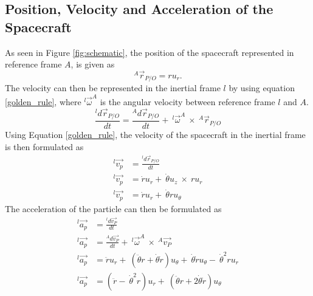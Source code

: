 \documentclass[]{article}
\begin{document}
	\subsection{Position, Velocity and Acceleration of the Spacecraft}
	As seen in Figure \ref{fig:schematic}, the position of the spacecraft represented in reference frame \(A\), is given as 
	\begin{equation} \label{position}
		^A\vec{r}_{P/O} = ru_{r}.
	\end{equation}
	The velocity can then be represented in the inertial frame \(l\) by using equation \ref{golden_rule}, where \(^l\vec{\omega}^A\) is the angular velocity between reference frame \(l\) and \(A\).
	\begin{equation} \label{golden_rule}
		\frac{^ld\vec{r}_{P/O}}{dt} = \frac{^Ad\vec{r}_{P/O}}{dt} +\ ^l\vec{\omega}^A\  \times\  ^A\vec{r}_{P/O} 
	\end{equation}
	Using Equation \ref{golden_rule}, the velocity of the spacecraft in the inertial frame is then formulated as
	\begin{align}
		^l\vec{v_{p}} &= \frac{^ld\vec{r}_{P/O}}{dt} \nonumber\\
		^l\vec{v_{p}} &= \dot{r}u_{r} +\ \dot{\theta}u_{z}\ \times\ ru_{r} \nonumber\\
		^l\vec{v_{p}} &= \dot{r}u_{r} +\ \dot{\theta}ru_{\theta} \label{velocity}
	\end{align}
	The acceleration of the particle can then be formulated as 
	\begin{align}
		^l\vec{a_{p}} &= \frac{^ld\vec{v_{P}}}{dt} \nonumber\\
		^l\vec{a_{p}} &= \frac{^Ad\vec{v_{P}}}{dt} +\ ^l\vec{\omega}^A\  \times\  ^A\vec{v_{P}} \nonumber\\
		^l\vec{a_{p}} &= \ddot{r}u_{r} +\ (\ddot{\theta}r+\dot{\theta}\dot{r})u_{\theta} +\ \dot{\theta}\dot{r}u_{\theta} -\ \dot{\theta}^2ru_{r} \nonumber\\
		^l\vec{a_{p}} &= (\ddot{r} -\ \dot{\theta}^2r)u_{r} +\ (\ddot{\theta}r+2\dot{\theta}\dot{r})u_{\theta}   \label{acceleration}
	\end{align}
	
\end{document}
